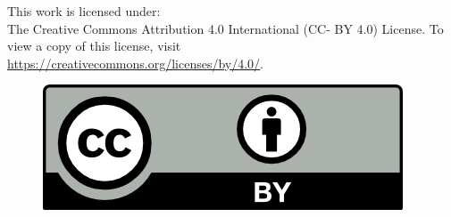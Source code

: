 \mbox{}
\vfill
\noindent This work is licensed under: \\
	The Creative Commons Attribution 4.0 International (CC- BY 4.0) License. To view a copy of this license, visit \\\url{https://creativecommons.org/licenses/by/4.0/}. \\
\begin{figure}[b]
	\includegraphics{preamble/by.png}
\end{figure}